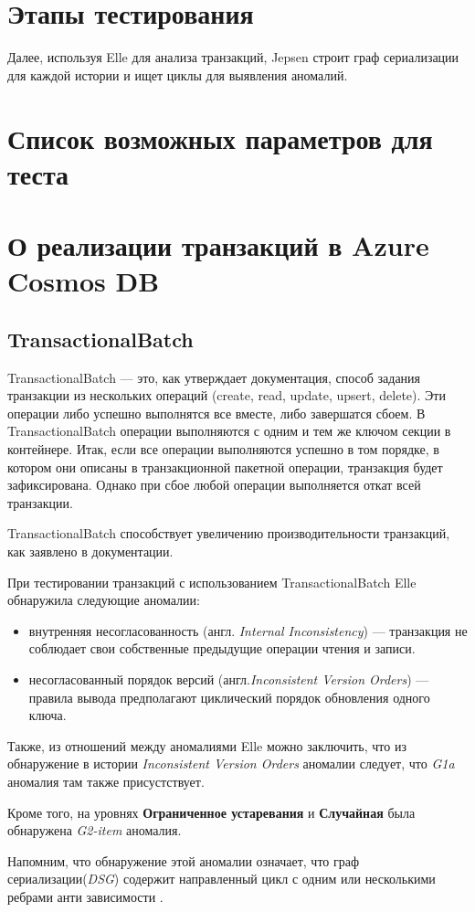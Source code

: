 \documentclass[12pt,  openany]{book}
\begin{document}
\section{Этапы тестирования}

Далее, используя Elle для анализа транзакций, Jepsen строит граф сериализации для каждой истории и ищет циклы для выявления аномалий. 

\section{Список возможных параметров для теста}


\section{О реализации транзакций в Azure Cosmos DB}
\subsection{TransactionalBatch}
TransactionalBatch --- это, как утверждает документация, способ задания транзакции из нескольких операций (create, read, update, upsert, delete). Эти операции либо успешно выполнятся все вместе, либо завершатся сбоем.  В TransactionalBatch операции выполняются с одним и тем же ключом секции в контейнере.  Итак, если все операции выполняются успешно в том порядке, в котором они описаны в транзакционной пакетной операции, транзакция будет зафиксирована. Однако при сбое любой операции выполняется откат всей транзакции.
\par TransactionalBatch способствует увеличению производительности транзакций, как заявлено в документации.
\par При тестировании транзакций с использованием TransactionalBatch Elle обнаружила следующие аномалии:
\begin{itemize}
\item внутренняя несогласованность (англ. \textit{Internal Inconsistency}) --- транзакция не соблюдает свои собственные предыдущие операции чтения и записи.
\item несогласованный порядок версий (англ.\textit{Inconsistent Version Orders}) --- правила вывода предполагают циклический порядок обновления одного ключа.
\end{itemize}
Также, из отношений между аномалиями Elle\cite{Kingsbury2020ElleII} можно заключить, что из обнаружение в истории  \textit{Inconsistent Version Orders} аномалии следует, что \textit{G1a} аномалия там также присустствует.
\par Кроме того, на уровнях \textbf{Ограниченное устаревания} и \textbf{Случайная} была обнаружена \textit{G2-item} аномалия. 
\par Напомним, что обнаружение этой аномалии означает, что граф сериализации(\textit{DSG}) содержит направленный цикл с одним или несколькими ребрами анти зависимости \cite{IsolationLevelDefinitions}.
\end{document}
